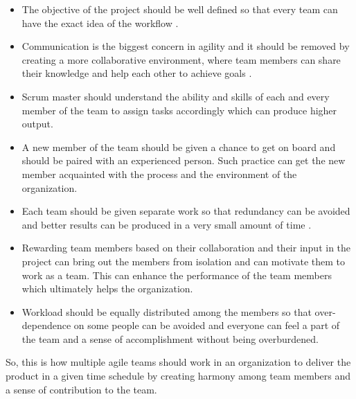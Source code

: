 \documentclass[sigplan,screen]{acmart}
\begin{document}
\begin{itemize}
\item The objective of the project should be well defined so that every team can have the exact idea of the workflow \cite{SAFe18}.
\item Communication is the biggest concern in agility and it should be removed by creating a more collaborative environment, where team members can share their knowledge and help each other to achieve goals \cite{Agile}.
\item Scrum master should understand the ability and skills of each and every member of the team to assign tasks accordingly which can produce higher output.
\item A new member of the team should be given a chance to get on board and should be paired with an experienced person. Such practice can get the new member acquainted with the process and the environment of the organization.
\item Each team should be given separate work so that redundancy can be avoided and better results can be produced in a very small amount of time \cite{GSA}.
\item Rewarding team members based on their collaboration and their input in the project can bring out the members from isolation and can motivate them to work as a team. This can enhance the performance of the team members which ultimately helps the organization. 
\item Workload should be equally distributed among the members so that over-dependence on some people can be avoided and everyone can feel a part of the team and a sense of accomplishment without being overburdened.
\end{itemize}
So, this is how multiple agile teams should work in an organization to deliver the product in a given time schedule by creating harmony among team members and a sense of contribution to the team. \\
\end{document}
